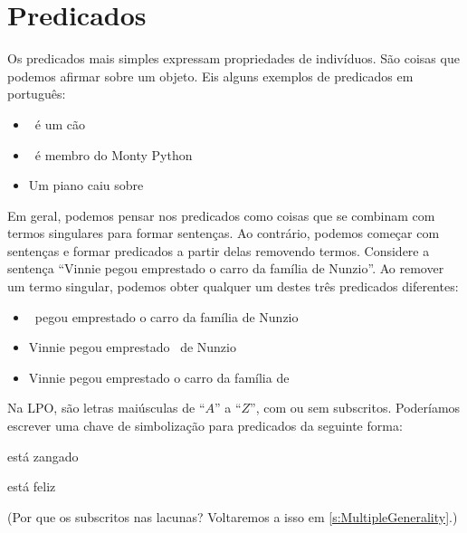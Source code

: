 \section{Predicados}
Os predicados mais simples expressam propriedades de indivíduos. São coisas que podemos afirmar sobre um objeto. Eis alguns exemplos de predicados em português:
	\begin{itemize}
		\item \blank\ é um cão
		\item \blank\ é membro do Monty Python
		\item Um piano caiu sobre \blank
	\end{itemize}
Em geral, podemos pensar nos predicados como coisas que se combinam com termos singulares para formar sentenças. Ao contrário, podemos começar com sentenças e formar predicados a partir delas removendo termos. Considere a sentença \textquotedblleft Vinnie pegou emprestado o carro da família de Nunzio\textquotedblright{}. Ao remover um termo singular, podemos obter qualquer um destes três predicados diferentes:
	\begin{itemize}
		\item \blank\ pegou emprestado o carro da família de Nunzio\\
		\item Vinnie pegou emprestado \blank\ de Nunzio\\
		\item Vinnie pegou emprestado o carro da família de \blank
	\end{itemize}
Na LPO,  são letras maiúsculas de \textquotedblleft $A$\textquotedblright{} a \textquotedblleft $Z$\textquotedblright{}, com ou sem subscritos. Poderíamos escrever uma chave de simbolização para predicados da seguinte forma:
	\begin{ekey}
		\item[\atom{A}{x}]  está zangado
		\item[\atom{H}{x}]  está feliz
	\end{ekey}
        (Por que os subscritos nas lacunas? Voltaremos a isso em \cref{s:MultipleGenerality}.)


